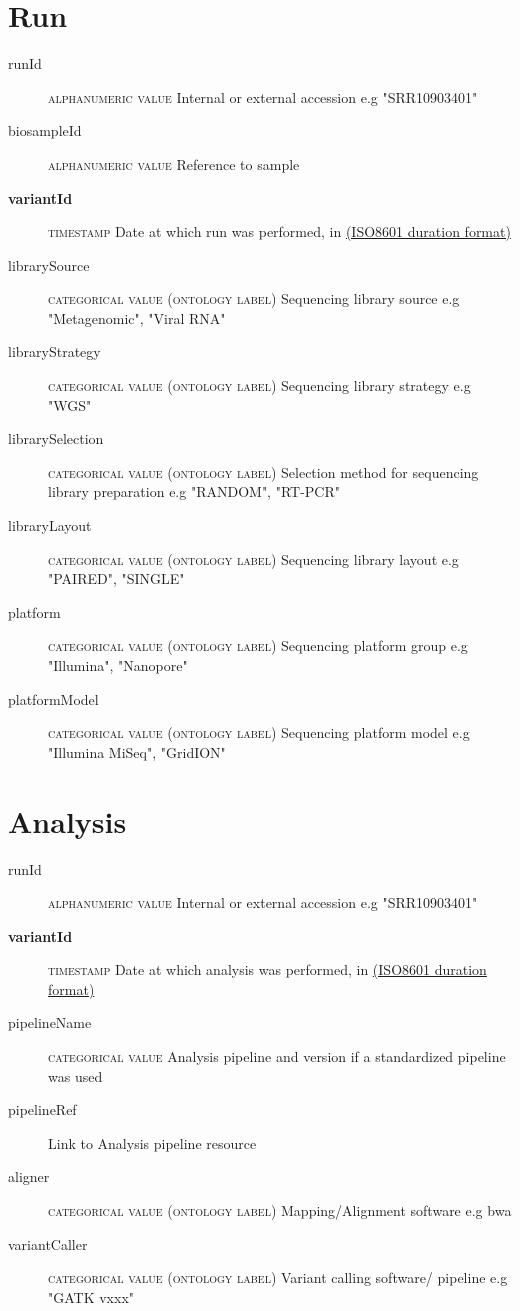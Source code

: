 \documentclass[a4paper, 10pt]{article}        %
\begin{document}
   \section*{ {\color{teal} Run}}
  
  \begin{description}
	\item[runId] {\textsc{alphanumeric value}}  Internal or external accession e.g "SRR10903401"
	\item[biosampleId] {\textsc{alphanumeric value}}  Reference to sample 
	\item[\textbf{variantId}] {\textsc{timestamp}} Date at which run was performed, in \href{link}{(ISO8601 duration format)}  	\item[librarySource] {\textsc{categorical value (ontology label)}}  Sequencing library source e.g "Metagenomic", "Viral RNA"
	\item[libraryStrategy]  {\textsc{categorical value (ontology label)}} Sequencing library strategy e.g "WGS"
	\item[librarySelection] {\textsc{categorical value (ontology label)}} Selection method for sequencing library preparation e.g "RANDOM", "RT-PCR"
	\item[libraryLayout] {\textsc{categorical value (ontology label)}}  Sequencing library layout e.g "PAIRED", "SINGLE"
	\item[platform] {\textsc{categorical value (ontology label)}} Sequencing platform group e.g "Illumina", "Nanopore"
	\item[platformModel] {\textsc{categorical value (ontology label)}} Sequencing platform model e.g "Illumina MiSeq", "GridION"
 \end{description}
 
 
 
   \section*{ {\color{teal} Analysis}}
  
  \begin{description}
	\item[runId] {\textsc{alphanumeric value}}  Internal or external accession e.g "SRR10903401"
	\item[\textbf{variantId}] {\textsc{timestamp}} Date at which analysis was performed,  in \href{link}{(ISO8601 duration format)}  
	\item[pipelineName]  {\textsc{categorical value}} Analysis pipeline and version if a standardized pipeline was used
	\item[pipelineRef]  Link to Analysis pipeline resource
	\item[aligner]  {\textsc{categorical value (ontology label)}} Mapping/Alignment software e.g bwa
	  \item[variantCaller]  {\textsc{categorical value (ontology label)}} Variant calling software/ pipeline e.g "GATK vxxx" %
 \end{description}
 
\end{document}
